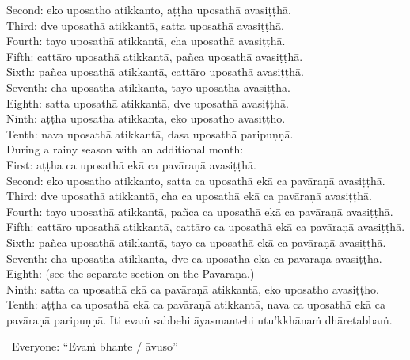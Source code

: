 {{{{{          Second: eko uposatho atikkanto, aṭṭha uposathā avasiṭṭhā.\\
          Third: dve uposathā atikkantā, satta uposathā avasiṭṭhā.\\
          Fourth: tayo uposathā atikkantā, cha uposathā avasiṭṭhā.\\
          Fifth: cattāro uposathā atikkantā, pañca uposathā avasiṭṭhā.\\
          Sixth: pañca uposathā atikkantā, cattāro uposathā avasiṭṭhā.\\
          Seventh: cha uposathā atikkantā, tayo uposathā avasiṭṭhā.\\
          Eighth: satta uposathā atikkantā, dve uposathā avasiṭṭhā.\\
          Ninth: aṭṭha uposathā atikkantā, eko uposatho avasiṭṭho.\\
          \smallskip
          Tenth: nava uposathā atikkantā, dasa uposathā paripuṇṇā.\\
          During a rainy season with an additional month:\\
          First: aṭṭha ca uposathā ekā ca pavāraṇā avasiṭṭhā.\\
          Second: eko uposatho atikkanto, satta ca uposathā ekā ca pavāraṇā avasiṭṭhā.\\
          Third: dve uposathā atikkantā, cha ca uposathā ekā ca pavāraṇā avasiṭṭhā.\\
          Fourth: tayo uposathā atikkantā, pañca ca uposathā ekā ca pavāraṇā avasiṭṭhā.\\
          Fifth: cattāro uposathā atikkantā, cattāro ca uposathā ekā ca pavāraṇā avasiṭṭhā.\\
          Sixth: pañca uposathā atikkantā, tayo ca uposathā ekā ca pavāraṇā avasiṭṭhā.\\
          Seventh: cha uposathā atikkantā, dve ca uposathā ekā ca pavāraṇā avasiṭṭhā.\\
          Eighth: (see the separate section on the Pavāraṇā.)\\
          Ninth: satta ca uposathā ekā ca pavāraṇā atikkantā, eko uposatho avasiṭṭho.\\
          Tenth: aṭṭha ca uposathā ekā ca pavāraṇā atikkantā, nava ca uposathā ekā ca pavāraṇā paripuṇṇā.}}}}}\makeatother \thickspace
Iti evaṁ sabbehi āyasmantehi utu'kkhānaṁ dhāretabbaṁ.

\begin{center}
  \anglebracketleft\ \hspace{-0.5mm}Everyone: ``Evaṁ bhante / āvuso'' \hspace{-0.5mm}\anglebracketright\
\end{center}

